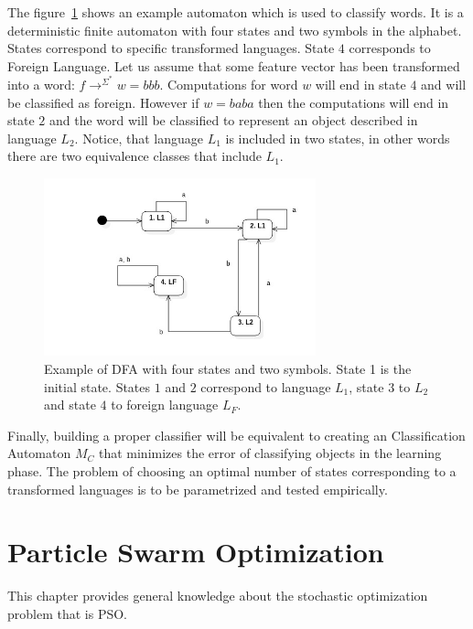 \documentclass{mini}
\newcommand{\featureTransformationWord}[1]{
    \rightarrow^{#1^{*}}
}
\begin{document}
The figure~\ref{fig:class_dfa} shows an example automaton which is used to classify words. It is a deterministic finite automaton with four states and two symbols in the alphabet. States correspond to specific transformed languages. State $4$ corresponds to Foreign Language. Let us assume that some feature vector has been transformed into a word: $f \featureTransformationWord{\Sigma} w = bbb$. Computations for word $w$ will end in state $4$ and will be classified as foreign. However if $w = baba$ then the computations will end in state $2$ and the word will be classified to represent an object described in language $L_2$. Notice, that language $L_1$ is included in two states, in other words there are two equivalence classes that include $L_1$.

\begin{figure}[H]
    \centering
    \includegraphics[width=0.7\textwidth]{../uml/states/dfa.jpg}
    \caption{Example of DFA with four states and two symbols. State 1 is the initial state. States $1$ and $2$ correspond to language $L_{1}$, state $3$ to $L_2$ and state $4$ to foreign language $L_F$.}
    \label{fig:class_dfa}
\end{figure}

Finally, building a proper classifier will be equivalent to creating an Classification Automaton $M_{C}$ that minimizes the error of classifying objects in the learning phase. The problem of choosing an optimal number of states corresponding to a transformed languages is to be parametrized and tested empirically.


\chapter{Particle Swarm Optimization}\label{chap:pso}
This chapter provides general knowledge about the stochastic optimization problem that is PSO.
\end{document}
